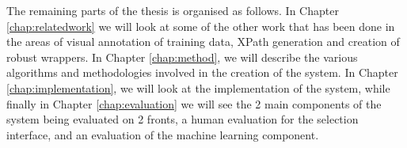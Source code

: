 The remaining parts of the thesis is organised as follows. In Chapter \ref{chap:relatedwork} we
will look at some of the other work that has been done in the areas of visual annotation of
training data, XPath generation and creation of robust wrappers. In Chapter \ref{chap:method},
we will describe the various algorithms and methodologies involved in the creation of the
system. In Chapter \ref{chap:implementation}, we will look at the implementation of the system,
while finally in Chapter \ref{chap:evaluation} we will see the 2 main components of the system
being evaluated on 2 fronts, a human evaluation for the selection interface, and an evaluation
of the machine learning component.
